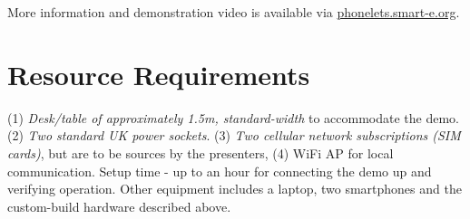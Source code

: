 \documentclass{sig-alternate-10pt}
\begin{document}
More information and demonstration video is available via \url{phonelets.smart-e.org}.


\section*{Resource Requirements}

(1) \emph{Desk/table of approximately 1.5m, standard-width} to accommodate the demo. (2) \emph{Two standard UK power sockets}. (3) \emph{Two cellular network subscriptions (SIM cards)}, but are to be sources by the presenters, (4) WiFi AP for local communication. Setup time - up to an hour for connecting the demo up and verifying operation. Other equipment includes a laptop, two smartphones and the custom-build hardware described above.


{\footnotesize 


}

%
\end{document}
